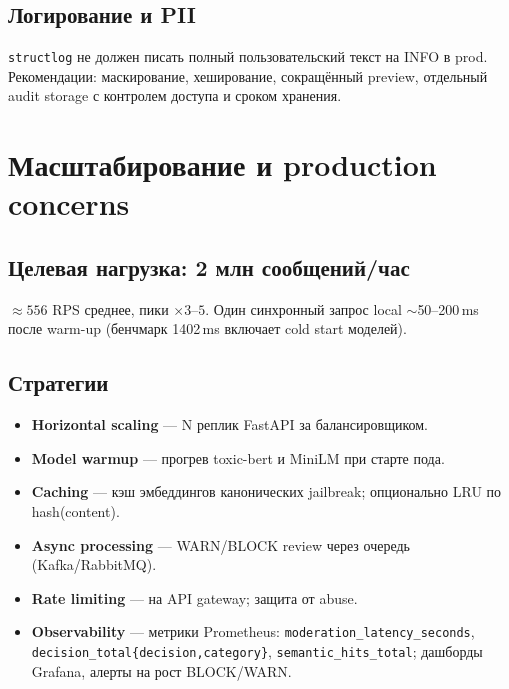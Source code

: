 \documentclass[12pt,a4paper]{report}
\begin{document}
\section{Логирование и PII}

\texttt{structlog} не должен писать полный пользовательский текст на INFO в prod.
Рекомендации: маскирование, хеширование, сокращённый preview, отдельный audit storage
с контролем доступа и сроком хранения.

\chapter{Масштабирование и production concerns}

\section{Целевая нагрузка: 2 млн сообщений/час}

$\approx 556$ RPS среднее, пики $\times 3$--$5$. Один синхронный запрос local
$\sim$50--200\,ms после warm-up (бенчмарк 1402\,ms включает cold start моделей).

\section{Стратегии}

\begin{itemize}
    \item \textbf{Horizontal scaling} --- N реплик FastAPI за балансировщиком.
    \item \textbf{Model warmup} --- прогрев toxic-bert и MiniLM при старте пода.
    \item \textbf{Caching} --- кэш эмбеддингов канонических jailbreak; опционально LRU по hash(content).
    \item \textbf{Async processing} --- WARN/BLOCK review через очередь (Kafka/RabbitMQ).
    \item \textbf{Rate limiting} --- на API gateway; защита от abuse.
    \item \textbf{Observability} --- метрики Prometheus: \texttt{moderation\_latency\_seconds},
    \texttt{decision\_total\{decision,category\}}, \texttt{semantic\_hits\_total};
    дашборды Grafana, алерты на рост BLOCK/WARN.
\end{itemize}

\end{document}
